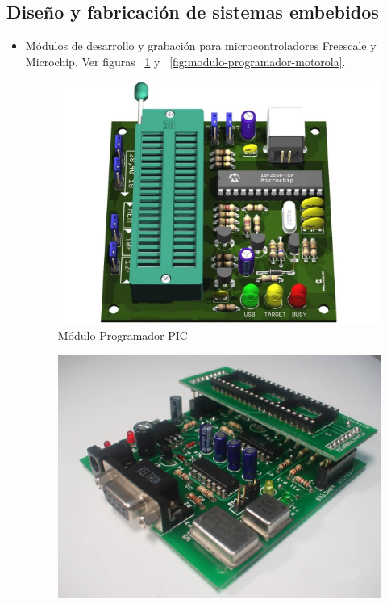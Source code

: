 \subsection{Diseño y fabricación de sistemas embebidos}
\begin{itemize}
  \item Módulos de desarrollo y grabación para microcontroladores Freescale y Microchip. Ver figuras ~\ref{fig:modulo-programador-pic} y ~\ref{fig:modulo-programador-motorola}.
    \begin{figure}[h!]
      \centering
      \includegraphics[scale=0.2]{images/company/modulo-programador-pic.jpg}
      \caption{Módulo Programador PIC}
      \label{fig:modulo-programador-pic}
    \end{figure}
    \begin{figure}[h!]
      \centering
      \includegraphics[scale=0.15]{images/company/modulo-programador-motorola.jpg}

\end{figure}
\end{itemize}
